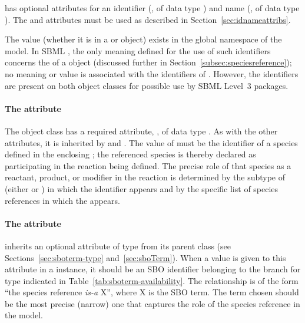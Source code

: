\SimpleSpeciesReference has optional attributes for an identifier
(, of data type ) and name (,
of data type ).  The  and 
attributes must be used as described in
Section~\ref{sec:idnameattribs}.

The  value (whether it is in a \SpeciesReference or
\ModifierSpeciesReference object) exists in the global namespace
of the model.  In SBML \thisLV, the only meaning defined for the
use of such identifiers concerns the  of a
\SpeciesReference object (discussed further in
Section~\ref{subsec:speciesreference}); no meaning or value is
associated with the identifiers of \ModifierSpeciesReference.
However, the identifiers are present on both object classes for
possible use by SBML Level~3 packages.


\paragraph{The  attribute}

The \SimpleSpeciesReference object class has a required attribute,
, of data type .  As with the
other attributes, it is inherited by \SpeciesReference and
\ModifierSpeciesReference.  The value of  must be
the identifier of a species defined in the enclosing \Model; the
referenced species is thereby declared as participating in the
reaction being defined.  The precise role of that species as a
reactant, product, or modifier in the reaction is determined by
the subtype of \SimpleSpeciesReference (\ie either
\SpeciesReference or \ModifierSpeciesReference) in which the
identifier appears and by the specific list of species references
in which the \SpeciesReference appears.


\paragraph{The  attribute}
\label{sec:simplespeciesreference-sboterm}

\SimpleSpeciesReference inherits an optional 
attribute of type  from its parent class \SBase
(see Sections~\ref{sec:sboterm-type} and~\ref{sec:sboTerm}).  When
a value is given to this attribute in a \SimpleSpeciesReference
instance, it should be an SBO identifier belonging to the branch
for type \SimpleSpeciesReference indicated in
Table~\ref{tab:sboterm-availability}.  The relationship is of the
form ``the species reference \emph{is-a} X'', where X is the SBO
term.  The term chosen should be the most precise (narrow) one
that captures the role of the species reference in the model.


